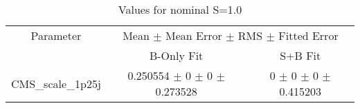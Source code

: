 \begin{table}
\centering
\caption{Values for nominal S=1.0}
\begin{tabular}{ccc}
\toprule
Parameter 	& \multicolumn{2}{c}{Mean $\pm$ Mean Error $\pm$ RMS $\pm$ Fitted Error}\\
 	& B-Only Fit & S+B Fit\\
\midrule
CMS\_scale\_1p25j 	& \num{0.250554} $\pm$ \num{0} $\pm$ \num{0} $\pm$ \num{0.273528} 	& \num{0} $\pm$ \num{0} $\pm$ \num{0} $\pm$ \num{0.415203}\\
\bottomrule
\end{tabular}
\end{table}